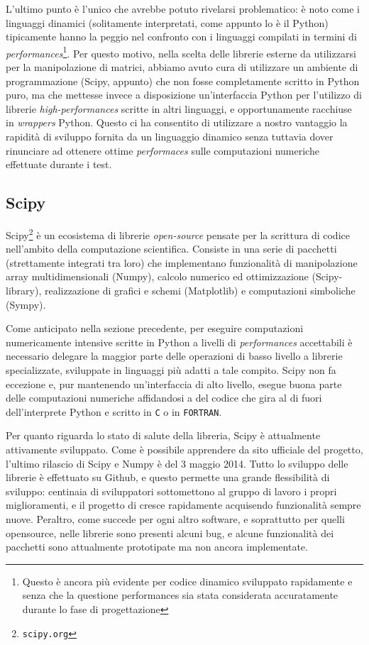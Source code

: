 \documentclass[11pt,a4paper]{scrartcl}
\begin{document}
L'ultimo punto è l'unico che avrebbe potuto rivelarsi problematico: è noto come i linguaggi dinamici (solitamente interpretati, come appunto lo è il Python) tipicamente hanno la peggio nel confronto con i linguaggi compilati in termini di \emph{performances}\footnote{Questo è ancora più evidente per codice dinamico sviluppato rapidamente e senza che la questione performances sia stata considerata accuratamente durante lo fase di progettazione}. Per questo motivo, nella scelta delle librerie esterne da utilizzarsi per la manipolazione di matrici, abbiamo avuto cura di utilizzare un ambiente di programmazione (Scipy, appunto) che non fosse completamente scritto in Python puro, ma che mettesse invece a disposizione un'interfaccia Python per l'utilizzo di librerie \emph{high-performances} scritte in altri linguaggi, e opportunamente racchiuse in \emph{wrappers} Python. Questo ci ha consentito di utilizzare a nostro vantaggio la rapidità di sviluppo fornita da un linguaggio dinamico senza tuttavia dover rinunciare ad ottenere ottime \emph{performaces} sulle computazioni numeriche effettuate durante i test.


\subsection*{Scipy}
Scipy\footnote{\texttt{scipy.org}} è un ecosistema di librerie \emph{open-source} pensate per la scrittura di codice nell'ambito della computazione scientifica. Consiste in una serie di pacchetti (strettamente integrati tra loro) che implementano funzionalità di manipolazione array multidimensionali (Numpy), calcolo numerico ed ottimizzazione (Scipy-library), realizzazione di grafici e schemi (Matplotlib) e computazioni simboliche (Sympy).

Come anticipato nella sezione precedente, per eseguire computazioni numericamente intensive scritte in Python a livelli di \emph{performances} accettabili è necessario delegare la maggior parte delle operazioni di basso livello a librerie specializzate, sviluppate in linguaggi più adatti a tale compito. Scipy non fa eccezione e, pur mantenendo un'interfaccia di alto livello, esegue buona parte delle computazioni numeriche affidandosi a del codice che gira al di fuori dell'interprete Python e scritto in \texttt{C} o in \texttt{FORTRAN}. 

Per quanto riguarda lo stato di salute della libreria, Scipy è attualmente attivamente sviluppato. Come è possibile apprendere da sito ufficiale del progetto, l'ultimo rilascio di Scipy e Numpy è del 3 maggio 2014. Tutto lo sviluppo delle librerie è effettuato su Github, e questo permette una grande flessibilità di sviluppo: centinaia di sviluppatori sottomettono al gruppo di lavoro i propri miglioramenti, e il progetto di cresce rapidamente acquisendo funzionalità sempre nuove. Peraltro, come succede per ogni altro software, e soprattutto per quelli opensource, nelle librerie sono presenti alcuni bug, e alcune funzionalità dei pacchetti sono attualmente prototipate ma non ancora implementate.
\end{document}
